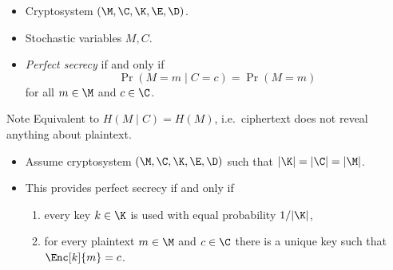 \begin{frame}
  \begin{definition}
    \begin{itemize}
      \item Cryptosystem \((\M, \C, \K, \E, \D)\).
      \item Stochastic variables \(M, C\).
      \item \emph{Perfect secrecy} if and only if \[\Pr(M = m\mid C = c) 
          = \Pr(M = m)\] for all \(m\in \M\) and \(c\in \C\).
    \end{itemize}
  \end{definition}

  \pause{}

  \begin{block}{Note}
    Equivalent to \(H(M\mid C) = H(M)\), i.e.\ ciphertext does not reveal 
    anything about plaintext.
  \end{block}
\end{frame}

\begin{frame}
  \begin{theorem}
    \begin{itemize}
      \item Assume cryptosystem \((\M, \C, \K, \E, \D)\) such that \(|\K| 
          = |\C| = |\M|\).

        \pause{}

      \item This provides perfect secrecy if and only if
        \begin{enumerate}
          \item every key \(k\in \K\) is used with equal probability 
            \(1/|\K|\),
          \item for every plaintext \(m\in \M\) and \(c\in \C\) there is 
            a unique key such that \(\Enc[k]{m} = c\).
        \end{enumerate}
    \end{itemize}
  \end{theorem}
\end{frame}

